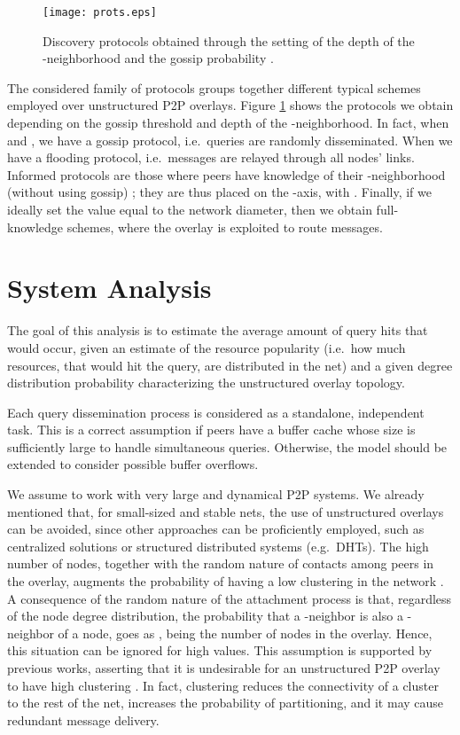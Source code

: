 \documentclass{sig-alternate}
\begin{document}
\begin{figure}[thbp]
   \centering
   \texttt{[image: prots.eps]}
  \vspace{-0.2cm}
\caption{Discovery protocols obtained through the setting of the depth of the -neighborhood and the gossip probability .}
   \label{fig:prots}
\end{figure}

The considered family of protocols groups together different typical schemes employed over unstructured P2P overlays.
Figure \ref{fig:prots} shows the protocols we obtain depending on the gossip threshold  and depth of the -neighborhood. In fact, when  and , we have a gossip protocol, i.e.~queries are randomly disseminated. When  we have a flooding protocol, i.e.~messages are relayed through all nodes' links.
Informed protocols are those where peers have knowledge of their -neighborhood (without using gossip) \cite{PuttaswamySZ08}; they are thus placed on the -axis, with .
Finally, if we ideally set the  value equal to the network diameter, then we obtain full-knowledge schemes, where the overlay is exploited to route messages.

\section{System Analysis}\label{sec:cn}

The goal of this analysis is to estimate the average amount of query hits  that would occur, given an estimate of the resource popularity (i.e.~how much resources, that would hit the query, are distributed in the net) and a given degree distribution probability characterizing the unstructured overlay topology. 

Each query dissemination process is considered as a standalone, independent task. This is a correct assumption if peers have a buffer cache whose size is sufficiently large to handle simultaneous queries. Otherwise, the model should be extended to consider possible buffer overflows. 

We assume to work with very large and dynamical P2P systems. We already mentioned that, for small-sized and stable nets, the use of unstructured overlays can be avoided, since other approaches can be proficiently employed, such as centralized solutions or structured distributed systems (e.g.~DHTs).
The high number of nodes, together with the random nature of contacts among peers in the overlay, augments the probability of having a low clustering in the network \cite{simplex,newmanHandbook}. 
A consequence of the random nature of the attachment process is that, regardless of the node degree distribution, the probability that a -neighbor is also a -neighbor of a node, goes as , being  the number of nodes in the overlay. Hence, this situation can be ignored for high  values. 
This assumption is supported by previous works, asserting that it is undesirable for an unstructured P2P overlay to have high clustering \cite{voulgaris.jnsm.2005}. In fact, clustering reduces the connectivity of a cluster to the rest of the net, increases the probability of partitioning, and it  may cause redundant message delivery. 
\end{document}

